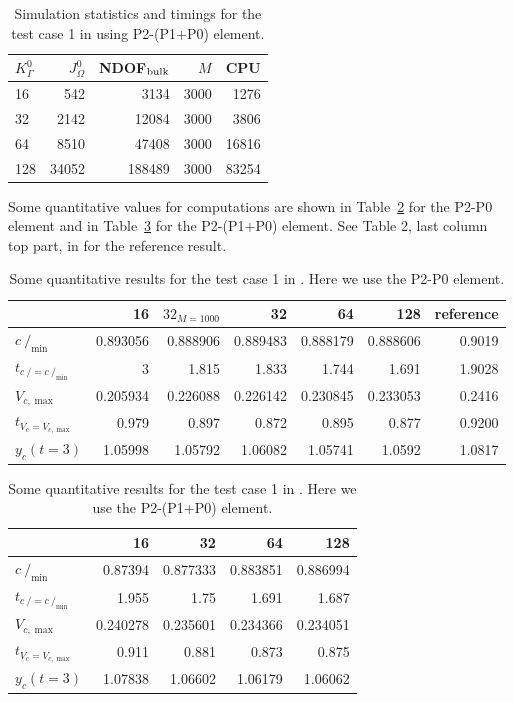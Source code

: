 \documentclass[a4paper,12pt,onecolumn]{article}
\newcommand{\strikec}{\mbox{$c\!\!\!\!\:/$}}
\begin{document}
\begin{table}
\center
\begin{tabular}{lrrrr}
\hline
$K^0_\Gamma$ & $J^0_\Omega$ & NDOF$_{\rm bulk}$ & $M$ & CPU \\
\hline
16 & 542 & 3134 & 3000 & 1276 \\
32 & 2142 & 12084 & 3000 & 3806 \\
64 & 8510 & 47408 & 3000 & 16816 \\
128 & 34052 & 188489 & 3000 & 83254 \\
\hline
\end{tabular}
\caption{Simulation statistics and timings for the test case 1 in
\cite{HysingTKPBGT09} using P2-(P1+P0) element.}
\label{tab:2d_CPU_P1P0}
\end{table}

Some quantitative values for computations are shown in
Table~\ref{tab:2d_benchmark1_P0} for the P2-P0 element and
in Table~\ref{tab:2d_benchmark1_P1P0} for the P2-(P1+P0) element. See Table 2,
last column top part, in \cite{fluidfbp} for the reference result.

\begin{table}
\center
\begin{tabular}{lrrrrrr}
\hline
& 16 & $32_{M=1000}$ & 32 & 64 & 128 & reference \\
\hline
$\strikec_{\min}$ & 0.893056 & 0.888906 & 0.889483 & 0.888179 & 0.888606 &
0.9019 \\
$t_{\strikec = \strikec_{\min}}$ & 3 & 1.815 & 1.833 & 1.744 & 1.691 & 1.9028 \\
$V_{c,\max}$ & 0.205934 & 0.226088 & 0.226142 & 0.230845 & 0.233053 & 0.2416 \\
$t_{V_c = V_{c,\max}}$ & 0.979 & 0.897 & 0.872 & 0.895 & 0.877 & 0.9200 \\
$y_c(t=3)$ & 1.05998 & 1.05792 & 1.06082 & 1.05741 & 1.0592  & 1.0817 \\
\hline
\end{tabular}
\caption{Some quantitative results for the test case 1 in
\cite{HysingTKPBGT09}. Here we use the P2-P0 element.}
\label{tab:2d_benchmark1_P0}
\end{table}

\begin{table}
\center
\begin{tabular}{lrrrr}
\hline
& 16 & 32 & 64 & 128 \\
\hline
$\strikec_{\min}$ & 0.87394 & 0.877333 & 0.883851 & 0.886994 \\
$t_{\strikec = \strikec_{\min}}$ & 1.955 & 1.75 & 1.691 & 1.687 \\
$V_{c,\max}$ & 0.240278 & 0.235601 & 0.234366 & 0.234051 \\
$t_{V_c = V_{c,\max}}$ & 0.911 & 0.881 & 0.873 & 0.875 \\
$y_c(t=3)$ & 1.07838 & 1.06602 & 1.06179 & 1.06062 \\
\hline
\end{tabular}
\caption{Some quantitative results for the test case 1 in
\cite{HysingTKPBGT09}. Here we use the P2-(P1+P0) element.}
\label{tab:2d_benchmark1_P1P0}
\end{table}
\end{document}
